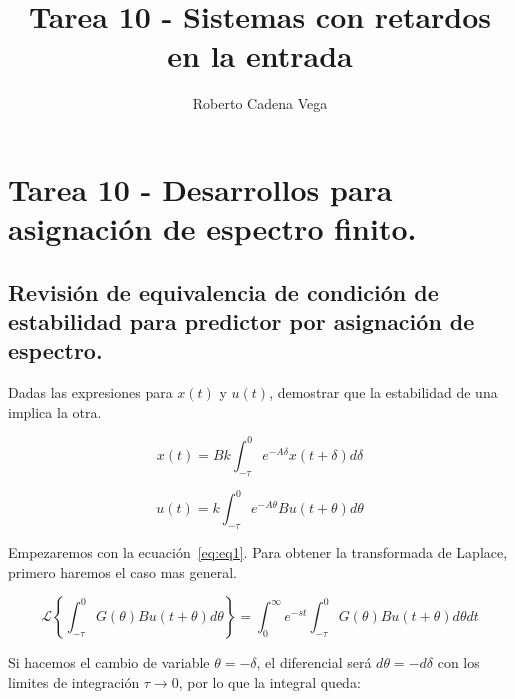 

\author{Roberto Cadena Vega}
\title{Tarea 10 - Sistemas con retardos en la entrada}


    \maketitle

    \section*{Tarea 10 - Desarrollos para asignación de espectro finito.}

        \subsection*{Revisión de equivalencia de condición de estabilidad para predictor por asignación de espectro.}

        Dadas las expresiones para $x(t)$ y $u(t)$, demostrar que la estabilidad de una implica la otra.

        \begin{equation} \label{eq:eq1}
            x(t) = Bk \int_{-\tau}^0 e^{-A \delta} x(t + \delta) d\delta
        \end{equation}

        \begin{equation} \label{eq:eq2}
            u(t) = k \int_{-\tau}^0 e^{-A \theta} B u(t + \theta) d\theta
        \end{equation}

        Empezaremos con la ecuación~\ref{eq:eq1}. Para obtener la transformada de Laplace, primero haremos el caso mas general.

        \begin{equation*}
            \mathcal{L} \left\{ \int_{-\tau}^0 G(\theta) B u(t + \theta) d\theta \right\} = \int_0^{\infty} e^{-st} \int_{-\tau}^0 G(\theta) B u(t + \theta) d\theta dt
        \end{equation*}

        Si hacemos el cambio de variable $\theta = -\delta$, el diferencial será $d\theta = -d\delta$ con los limites de integración $\tau \to 0$, por lo que la integral queda:


